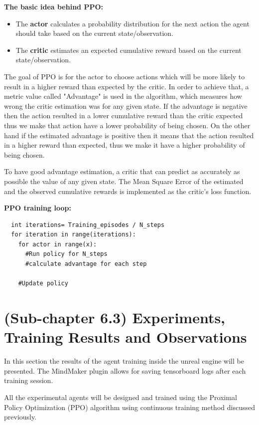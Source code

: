 \documentclass[a4paper,one side,12pt]{book}
\begin{document}
\textbf{The basic idea behind PPO:}
\begin{itemize}
  \item
    The \textbf{actor} calculates a probability distribution for the next action the agent should take based on the current state/observation.
  \item
    The \textbf{critic} estimates an expected cumulative reward based on the current state/observation.
  \end{itemize}

The goal of PPO is for the actor to choose actions which will be more likely to result in a higher reward than expected by the critic.
In order to achieve that, a metric value called "Advantage" is used in the algorithm, which measures how wrong the critic estimation was for any given state.
If the advantage is negative then the action resulted in a lower cumulative reward than the critic expected thus we make that action have a lower probability of being chosen.
On the other hand if the estimated advantage is positive then it means that the action resulted in a higher reward than expected, thus we make it have a higher probability of being chosen.

To have good advantage estimation, a critic that can predict as accurately as possible the value of any given state. 
The Mean Square Error of the estimated and the observed cumulative rewards is implemented as the critic's loss function.

\textbf{PPO training loop:}
\begin{verbatim}
  int iterations= Training_episodes / N_steps
  for iteration in range(iterations):
    for actor in range(x):
      #Run policy for N_steps
      #calculate advantage for each step
    
    #Update policy

\end{verbatim}


\section{(Sub-chapter 6.3) Experiments, Training Results and Observations}

In this section the results of the agent training inside the unreal
engine will be presented. The MindMaker plugin allows for saving
tensorboard logs after each training session.

All the experimental agents will be designed and trained using the Proximal Policy Optimization
(PPO) algorithm using continuous training method discussed previously.
\end{document}
